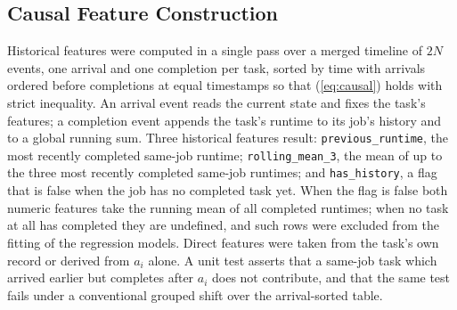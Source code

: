 \documentclass[conference]{IEEEtran}
\begin{document}
\subsection{Causal Feature Construction}
Historical features were computed in a single pass over a merged timeline of
$2N$ events, one arrival and one completion per task, sorted by time with
arrivals ordered before completions at equal timestamps so that
(\ref{eq:causal}) holds with strict inequality. An arrival event reads the
current state and fixes the task's features; a completion event appends the
task's runtime to its job's history and to a global running sum. Three
historical features result: \texttt{previous\_runtime}, the most recently
completed same-job runtime; \texttt{rolling\_mean\_3}, the mean of up to the
three most recently completed same-job runtimes; and \texttt{has\_history}, a
flag that is false when the job has no completed task yet. When the flag is
false both numeric features take the running mean of all completed runtimes;
when no task at all has completed they are undefined, and such rows were
excluded from the fitting of the regression models. Direct features were
taken from the task's own record or derived from $a_i$ alone. A unit test
asserts that a same-job task which arrived earlier but completes after $a_i$
does not contribute, and that the same test fails under a conventional
grouped shift over the arrival-sorted table.
\end{document}
